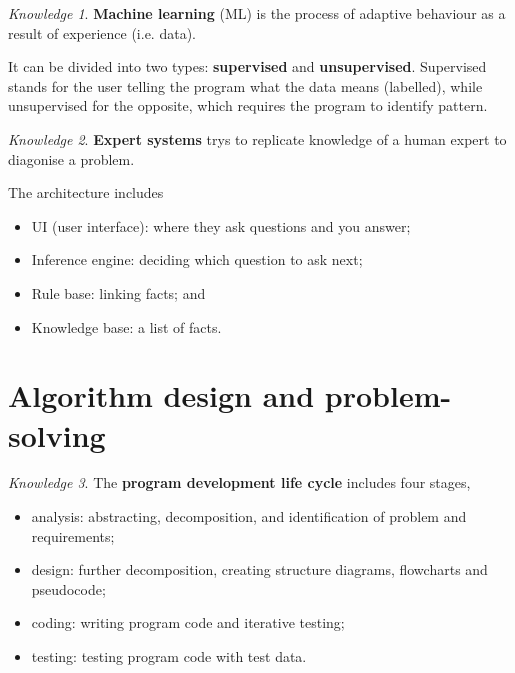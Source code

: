 \documentclass[8pt]{article}
\theoremstyle{remark}
\newtheorem{knowledge}{Knowledge}[subsection]
\begin{document}
            \begin{knowledge}
                \textbf{Machine learning} (ML) is the process of adaptive behaviour as a result of experience (i.e. data).

                It can be divided into two types: \textbf{supervised} and \textbf{unsupervised}. Supervised stands for the user telling the program what the data means (labelled), while unsupervised for the opposite, which requires the program to identify pattern.
            \end{knowledge}

            \begin{knowledge}
                \textbf{Expert systems} trys to replicate knowledge of a human expert to diagonise a problem.

                The architecture includes
                \begin{itemize}
                    \item UI (user interface): where they ask questions and you answer;
                    \item Inference engine: deciding which question to ask next;
                    \item Rule base: linking facts; and
                    \item Knowledge base: a list of facts.
                \end{itemize}
            \end{knowledge}

    \section{Algorithm design and problem-solving}
        \begin{knowledge}
            The \textbf{program development life cycle} includes four stages,
            \begin{itemize}
                \item analysis: abstracting, decomposition, and identification of problem and requirements;
                \item design: further decomposition, creating structure diagrams, flowcharts and pseudocode;
                \item coding: writing program code and iterative testing;
                \item testing: testing program code with test data.
            \end{itemize}
        \end{knowledge}
\end{document}
